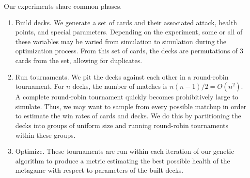 Our experiments share common phases.

\begin{enumerate}
	\item Build decks. We generate a set of cards and their associated attack, health points, and special parameters.
	Depending on the experiment, some or all of these variables may be varied from simulation to simulation during the optimization process.
	From this set of cards, the decks are permutations of 3 cards from the set, allowing for duplicates.
	\item Run tournaments. We pit the decks against each other in a round-robin tournament. For $n$ decks,
	the number of matches is $n(n-1)/2 = O(n^2)$. A complete round-robin tournament quickly becomes prohibitively large to simulate.
	Thus, we may want to sample from every possible matchup in order to estimate the win rates of cards and decks. We do this by 
	partitioning the decks into groups of uniform size and running round-robin tournaments within these groups.
	\item Optimize. These tournaments are run within each iteration of our genetic algorithm to produce a metric estimating the best
	possible health of the metagame with respect to parameters of the built decks.
\end{enumerate}

